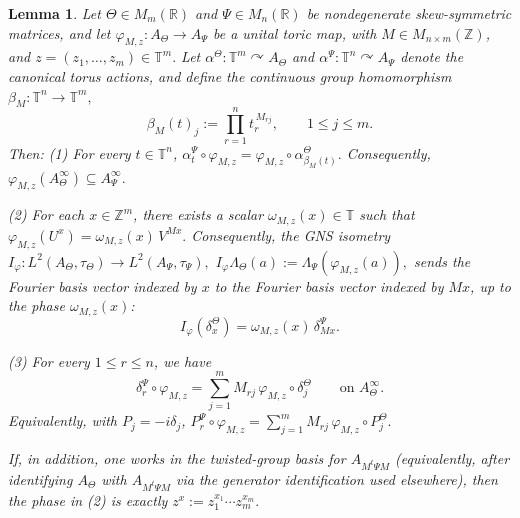 \documentclass[11pt]{amsart}
\newtheorem{lemma}[theorem]{Lemma}
\theoremstyle{definition}
\theoremstyle{remark}
\newcommand{\T}{\mathbb{T}}
\newcommand{\Z}{\mathbb{Z}}
\newcommand{\R}{\mathbb{R}}
\begin{document}
\begin{lemma}
\label{lem:toric-fourier-smooth-derivations}
Let $\Theta\in M_m(\R)$ and $\Psi\in M_n(\R)$ be nondegenerate
skew-symmetric matrices, and let $\varphi_{M,z}\colon A_\Theta\to A_\Psi$
be a unital toric map, with $M\in M_{n\times m}(\Z)$, and 
$z=(z_1,\ldots,z_m)\in\T^m.$
Let $\alpha^\Theta\colon \T^m\curvearrowright A_\Theta$ and $
\alpha^\Psi\colon \T^n\curvearrowright A_\Psi$
denote the canonical torus actions, and define the continuous group
homomorphism $\beta_M\colon \T^n\to \T^m,$\[
\beta_M(t)_j:=\prod_{r=1}^n t_r^{\,M_{rj}},
\qquad
1\le j\le m.
\]
Then: \emph{(1)}  For every $t\in\T^n$,
$\alpha_t^\Psi\circ\varphi_{M,z}=\varphi_{M,z}\circ \alpha_{\beta_M(t)}^\Theta.$
Consequently, $\varphi_{M,z}(A_\Theta^\infty)\subseteq A_\Psi^\infty.$
\smallskip

\noindent
 \emph{(2)}  For each $x\in\Z^m$, there exists a scalar $\omega_{M,z}(x)\in\T$
such that $\varphi_{M,z}(U^x)=\omega_{M,z}(x)\,V^{Mx}.$
Consequently, the GNS isometry
$I_\varphi\colon L^2(A_\Theta,\tau_\Theta)\to L^2(A_\Psi,\tau_\Psi),$
 $I_\varphi\Lambda_\Theta(a):=\Lambda_\Psi(\varphi_{M,z}(a)),$
sends the Fourier basis vector indexed by $x$ to the Fourier basis vector
indexed by $Mx$, up to the phase $\omega_{M,z}(x)$:
\[
I_\varphi(\delta_x^\Theta)=\omega_{M,z}(x)\,\delta_{Mx}^\Psi.
\]
\smallskip

\noindent
 \emph{(3)} For every $1\le r\le n$, we have
\begin{equation}\label{eq:toric-derivation-formula-merged}
\delta_r^\Psi\circ\varphi_{M,z}
=
\sum_{j=1}^m M_{rj}\,\varphi_{M,z}\circ\delta_j^\Theta
\qquad\text{on }A_\Theta^\infty.
\end{equation}
Equivalently, with $P_j=-i\delta_j$, $P_r^\Psi\circ\varphi_{M,z}=\sum_{j=1}^m M_{rj}\,\varphi_{M,z}\circ P_j^\Theta.$

If, in addition, one works in the twisted-group basis for
$A_{M^t\Psi M}$ (equivalently, after identifying $A_\Theta$ with
$A_{M^t\Psi M}$ via the generator identification used elsewhere), then the
phase in \textup{(2)} is exactly $z^x:=z_1^{x_1}\cdots z_m^{x_m}.$
\end{lemma}
\end{document}
